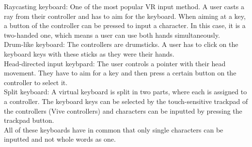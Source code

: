 Raycasting keyboard: One of the most popular VR input method. A user casts a ray from their controller and has to aim for the keyboard. When aiming at a key, a button of the controller can be pressed to input a character. In this case, it is a two-handed one, which means a user can use both hands simultaneously.\\

Drum-like keyboard: The controllers are drumsticks. A user has to click on the keyboard keys with these sticks as they were their hands.\\

Head-directed input keybpard: The user controls a pointer with their head movement. They have to aim for a key and then press a certain button on the controller to select it.\\

Split keyboard: A virtual keyboard is split in two parts, where each is assigned to a controller. The keyboard keys can be selected by the touch-sensitive trackpad of the controllers (Vive controllers) and characters can be inputted by pressing the trackpad button.\\

All of these keyboards have in common that only single characters can be inputted and not whole words as one.
\label{sec:other_keyboards}